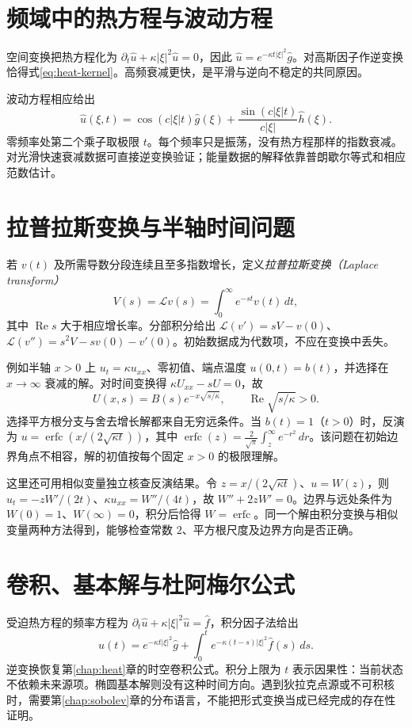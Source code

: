 \section{频域中的热方程与波动方程}
空间变换把热方程化为 $\partial_t\widehat u+\kappa|\xi|^2\widehat u=0$，因此 $\widehat u=e^{-\kappa t|\xi|^2}\widehat g$。对高斯因子作逆变换恰得式\eqref{eq:heat-kernel}。高频衰减更快，是平滑与逆向不稳定的共同原因。

波动方程相应给出
\begin{equation}
 \widehat u(\xi,t)=\cos(c|\xi|t)\widehat g(\xi)
 +\frac{\sin(c|\xi|t)}{c|\xi|}\widehat h(\xi).
 \label{eq:wave-fourier}
\end{equation}
零频率处第二个乘子取极限 $t$。每个频率只是振荡，没有热方程那样的指数衰减。对光滑快速衰减数据可直接逆变换验证；能量数据的解释依靠普朗歇尔等式和相应范数估计。

\section{拉普拉斯变换与半轴时间问题}
若 $v(t)$ 及所需导数分段连续且至多指数增长，定义\emph{拉普拉斯变换（Laplace transform）}
\[
 V(s)=\mathcal Lv(s)=\int_0^\infty e^{-st}v(t)\,dt,
\]
其中 $\operatorname{Re}s$ 大于相应增长率。分部积分给出 $\mathcal L(v')=sV-v(0)$、$\mathcal L(v'')=s^2V-sv(0)-v'(0)$。初始数据成为代数项，不应在变换中丢失。

例如半轴 $x>0$ 上 $u_t=\kappa u_{xx}$、零初值、端点温度 $u(0,t)=b(t)$，并选择在 $x\to\infty$ 衰减的解。对时间变换得 $\kappa U_{xx}-sU=0$，故
\[
 U(x,s)=B(s)e^{-x\sqrt{s/\kappa}},\qquad \operatorname{Re}\sqrt{s/\kappa}>0.
\]
选择平方根分支与舍去增长解都来自无穷远条件。当 $b(t)=1$（$t>0$）时，反演为 $u=\operatorname{erfc}(x/(2\sqrt{\kappa t}))$，其中 $\operatorname{erfc}(z)=\frac2{\sqrt\pi}\int_z^\infty e^{-r^2}\,dr$。该问题在初始边界角点不相容，解的初值按每个固定 $x>0$ 的极限理解。

这里还可用相似变量独立核查反演结果。令 $z=x/(2\sqrt{\kappa t})$、$u=W(z)$，则 $u_t=-zW'/(2t)$、$\kappa u_{xx}=W''/(4t)$，故 $W''+2zW'=0$。边界与远处条件为 $W(0)=1$、$W(\infty)=0$，积分后恰得 $W=\operatorname{erfc}$。同一个解由积分变换与相似变量两种方法得到，能够检查常数 $2$、平方根尺度及边界方向是否正确。

\section{卷积、基本解与杜阿梅尔公式}
受迫热方程的频率方程为 $\partial_t\widehat u+\kappa|\xi|^2\widehat u=\widehat f$，积分因子法给出
\[
 \widehat u(t)=e^{-\kappa t|\xi|^2}\widehat g+
 \int_0^t e^{-\kappa(t-s)|\xi|^2}\widehat f(s)\,ds.
\]
逆变换恢复第\ref{chap:heat}章的时空卷积公式。积分上限为 $t$ 表示因果性：当前状态不依赖未来源项。椭圆基本解则没有这种时间方向。遇到狄拉克点源或不可积核时，需要第\ref{chap:sobolev}章的分布语言，不能把形式变换当成已经完成的存在性证明。

